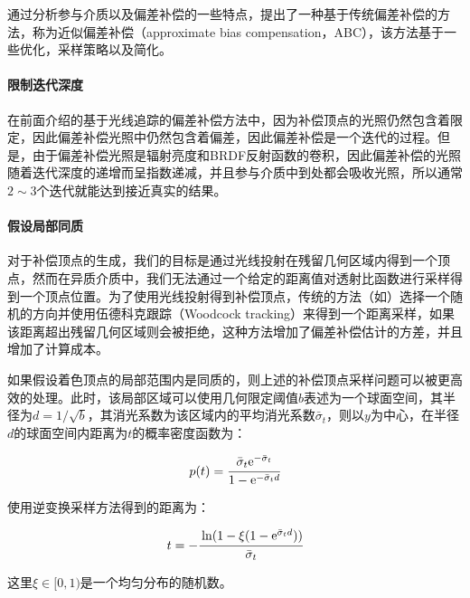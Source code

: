 通过分析参与介质以及偏差补偿的一些特点，\cite{a:ApproximateBiasCompensationforRenderingSceneswithHeterogeneousParticipatingMedia}提出了一种基于传统偏差补偿的方法，称为近似偏差补偿（approximate bias compensation，ABC），该方法基于一些优化，采样策略以及简化。



\paragraph{限制迭代深度}
在前面介绍的基于光线追踪的偏差补偿方法中，因为补偿顶点的光照仍然包含着限定，因此偏差补偿光照中仍然包含着偏差，因此偏差补偿是一个迭代的过程。但是，由于偏差补偿光照是辐射亮度和BRDF反射函数的卷积，因此偏差补偿的光照随着迭代深度的递增而呈指数递减，并且参与介质中到处都会吸收光照，所以通常$2\sim 3$个迭代就能达到接近真实的结果。



\paragraph{假设局部同质}
对于补偿顶点的生成，我们的目标是通过光线投射在残留几何区域内得到一个顶点，然而在异质介质中，我们无法通过一个给定的距离值对透射比函数进行采样得到一个顶点位置。为了使用光线投射得到补偿顶点，传统的方法（如\cite{a:UnbiasedGlobalIlluminationwithParticipatingMedia}）选择一个随机的方向并使用伍德科克跟踪（Woodcock tracking）来得到一个距离采样，如果该距离超出残留几何区域则会被拒绝，这种方法增加了偏差补偿估计的方差，并且增加了计算成本。

如果假设着色顶点的局部范围内是同质的，则上述的补偿顶点采样问题可以被更高效的处理。此时，该局部区域可以使用几何限定阈值$b$表述为一个球面空间，其半径为$d=1/\sqrt{{b}}$，其消光系数为该区域内的平均消光系数$\bar{\sigma}_t$，则以$y$为中心，在半径$d$的球面空间内距离为$t$的概率密度函数为：

\begin{equation}
	p(t)= \cfrac{\bar{\sigma}_t {\rm e}^{-\bar{\sigma}_t}}{1-{\rm e}^{-\bar{\sigma}_t d}}
\end{equation}

\noindent 使用逆变换采样方法得到的距离为：

\begin{equation}
	t=- \cfrac{\ln(1-\xi(1-{\rm e}^{\bar{\sigma}_td}))}{\bar{\sigma}_t}
\end{equation}

\noindent 这里$\xi\in[0,1)$是一个均匀分布的随机数。

